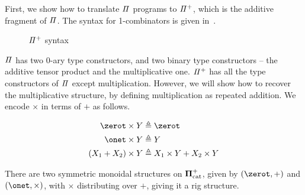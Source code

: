 First, we show how to translate $\mathit{\Pi}$ programs to $\mathit{{\Pi}^{+}}$, which is the additive fragment of $\mathit{\Pi}$. The
syntax for 1-combinators is given in~.

\begin{figure}[t]
  {}

  {}
  \caption{$\mathit{{\Pi}^{+}}$ syntax}
  \label{fig:piplus}
\end{figure}

$\mathit{\Pi}$ has two 0-ary type constructors, and two binary type constructors -- the additive tensor product and the
multiplicative one. $\mathit{{\Pi}^{+}}$ has all the type constructors of $\mathit{\Pi}$ except multiplication. However, we will
show how to recover the multiplicative structure, by defining multiplication as repeated addition. We encode $\times$ in
terms of $+$ as follows.

\begin{definition}[$\times : \UPlus \to \UPlus \to \UPlus$]
  \begin{align*}
    \zerot \times Y      & \defeq \zerot                      \\
    \onet \times Y       & \defeq Y                           \\
    (X_1 + X_2) \times Y & \defeq X_1 \times Y + X_2 \times Y
  \end{align*}
\end{definition}

\begin{lemma}
  There are two symmetric monoidal structures on $\mathbf{\Pi}^{+}_{\mathrm{cat}}$, given by $(\zerot, +)$ and $(\onet, \times)$, with
  $\times$ distributing over $+$, giving it a rig structure.
\end{lemma}

